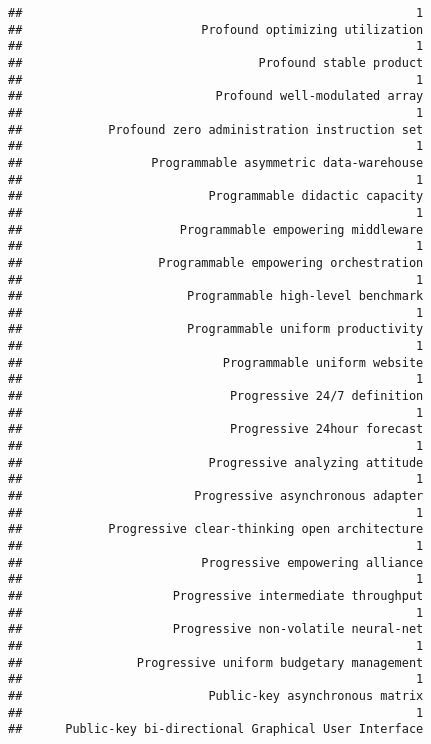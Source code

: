 \documentclass[
]{article}
\begin{document}
\begin{verbatim}
##                                                       1 
##                         Profound optimizing utilization 
##                                                       1 
##                                 Profound stable product 
##                                                       1 
##                           Profound well-modulated array 
##                                                       1 
##            Profound zero administration instruction set 
##                                                       1 
##                  Programmable asymmetric data-warehouse 
##                                                       1 
##                          Programmable didactic capacity 
##                                                       1 
##                      Programmable empowering middleware 
##                                                       1 
##                   Programmable empowering orchestration 
##                                                       1 
##                       Programmable high-level benchmark 
##                                                       1 
##                       Programmable uniform productivity 
##                                                       1 
##                            Programmable uniform website 
##                                                       1 
##                             Progressive 24/7 definition 
##                                                       1 
##                             Progressive 24hour forecast 
##                                                       1 
##                          Progressive analyzing attitude 
##                                                       1 
##                        Progressive asynchronous adapter 
##                                                       1 
##            Progressive clear-thinking open architecture 
##                                                       1 
##                         Progressive empowering alliance 
##                                                       1 
##                     Progressive intermediate throughput 
##                                                       1 
##                     Progressive non-volatile neural-net 
##                                                       1 
##                Progressive uniform budgetary management 
##                                                       1 
##                          Public-key asynchronous matrix 
##                                                       1 
##      Public-key bi-directional Graphical User Interface 

\end{verbatim}
\end{document}
